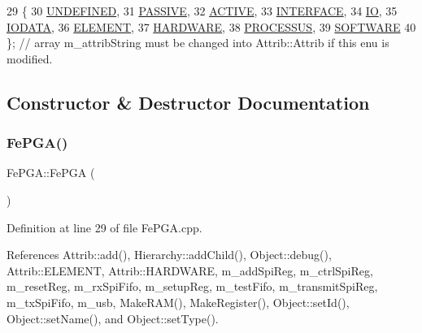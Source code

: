 \begin{DoxyCode}
29                 \{
30     \hyperlink{classAttrib_a69e171d7cc6417835a5a306d3c764235a3a8da2ab97dda18aebab196fe4100531}{UNDEFINED},
31     \hyperlink{classAttrib_a69e171d7cc6417835a5a306d3c764235a2bfb2af57b87031d190a05fe25dd92ed}{PASSIVE},
32     \hyperlink{classAttrib_a69e171d7cc6417835a5a306d3c764235a3b1fec929c0370d1436f2f06e298fb0d}{ACTIVE},
33     \hyperlink{classAttrib_a69e171d7cc6417835a5a306d3c764235aa27c16b480a369ea4d18b07b2516bbc7}{INTERFACE},
34     \hyperlink{classAttrib_a69e171d7cc6417835a5a306d3c764235a1420a5b8c0540b2af210b6975eded7f9}{IO},
35     \hyperlink{classAttrib_a69e171d7cc6417835a5a306d3c764235a0af3b0d0ac323c1704e6c69cf90add28}{IODATA},
36     \hyperlink{classAttrib_a69e171d7cc6417835a5a306d3c764235a7788bc5dd333fd8ce18562b269c9dab1}{ELEMENT},
37     \hyperlink{classAttrib_a69e171d7cc6417835a5a306d3c764235a61ceb22149f365f1780d18f9d1459423}{HARDWARE},
38     \hyperlink{classAttrib_a69e171d7cc6417835a5a306d3c764235a75250e29692496e73effca2c0330977f}{PROCESSUS},
39     \hyperlink{classAttrib_a69e171d7cc6417835a5a306d3c764235a103a67cd0b8f07ef478fa45d4356e27b}{SOFTWARE} 
40   \}; \textcolor{comment}{// array m\_attribString must be changed into Attrib::Attrib if this enu is modified. }
\end{DoxyCode}


\subsection{Constructor \& Destructor Documentation}
\mbox{\label{classFePGA_a377ae8860fbb3162e0c49dd08197a670}} 
\subsubsection{\texorpdfstring{Fe\+P\+G\+A()}{FePGA()}}
{\footnotesize\ttfamily Fe\+P\+G\+A\+::\+Fe\+P\+GA (\begin{DoxyParamCaption}{ }\end{DoxyParamCaption})}



Definition at line 29 of file Fe\+P\+G\+A.\+cpp.



References Attrib\+::add(), Hierarchy\+::add\+Child(), Object\+::debug(), Attrib\+::\+E\+L\+E\+M\+E\+NT, Attrib\+::\+H\+A\+R\+D\+W\+A\+RE, m\+\_\+add\+Spi\+Reg, m\+\_\+ctrl\+Spi\+Reg, m\+\_\+reset\+Reg, m\+\_\+rx\+Spi\+Fifo, m\+\_\+setup\+Reg, m\+\_\+test\+Fifo, m\+\_\+transmit\+Spi\+Reg, m\+\_\+tx\+Spi\+Fifo, m\+\_\+usb, Make\+R\+A\+M(), Make\+Register(), Object\+::set\+Id(), Object\+::set\+Name(), and Object\+::set\+Type().


